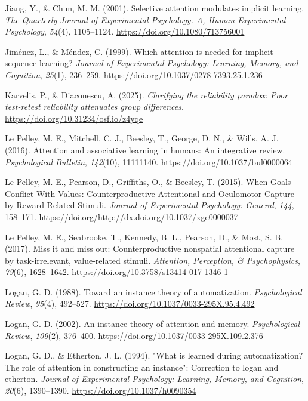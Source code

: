 \documentclass[
  jou,
  floatsintext,
  longtable,
  nolmodern,
  notxfonts,
  notimes,
  colorlinks=true,linkcolor=blue,citecolor=blue,urlcolor=blue]{apa7}
\newlength{\cslhangindent}
\newenvironment{CSLReferences}[2] %
 {\begin{list}{}{%
  \setlength{\itemindent}{0pt}
  \setlength{\leftmargin}{0pt}
  \setlength{\parsep}{0pt}
  \ifodd #1
   \setlength{\leftmargin}{\cslhangindent}
   \setlength{\itemindent}{-1\cslhangindent}
  \fi
  \setlength{\itemsep}{#2\baselineskip}}}
 {\end{list}}
\begin{document}
\begin{CSLReferences}{1}{0}
Jiang, Y., \& Chun, M. M. (2001). Selective attention modulates implicit
learning. \emph{The Quarterly Journal of Experimental Psychology. A,
Human Experimental Psychology}, \emph{54}(4), 1105--1124.
\url{https://doi.org/10.1080/713756001}

Jiménez, L., \& Méndez, C. (1999). Which attention is needed for
implicit sequence learning? \emph{Journal of Experimental Psychology:
Learning, Memory, and Cognition}, \emph{25}(1), 236--259.
\url{https://doi.org/10.1037/0278-7393.25.1.236}

Karvelis, P., \& Diaconescu, A. (2025). \emph{Clarifying the reliability
paradox: Poor test-retest reliability attenuates group differences}.
\url{https://doi.org/10.31234/osf.io/z4yqe}

Le Pelley, M. E., Mitchell, C. J., Beesley, T., George, D. N., \& Wills,
A. J. (2016). Attention and associative learning in humans: An
integrative review. \emph{Psychological Bulletin}, \emph{142}(10),
11111140. \url{https://doi.org/10.1037/bul0000064}

Le Pelley, M. E., Pearson, D., Griffiths, O., \& Beesley, T. (2015).
When Goals Conflict With Values: Counterproductive Attentional and
Oculomotor Capture by Reward-Related Stimuli. \emph{Journal of
Experimental Psychology: General}, \emph{144}, 158--171.
https://doi.org/\url{http://dx.doi.org/10.1037/xge0000037}

Le Pelley, M. E., Seabrooke, T., Kennedy, B. L., Pearson, D., \& Most,
S. B. (2017). Miss it and miss out: Counterproductive nonspatial
attentional capture by task-irrelevant, value-related stimuli.
\emph{Attention, Perception, \& Psychophysics}, \emph{79}(6),
1628--1642. \url{https://doi.org/10.3758/s13414-017-1346-1}

Logan, G. D. (1988). Toward an instance theory of automatization.
\emph{Psychological Review}, \emph{95}(4), 492--527.
\url{https://doi.org/10.1037/0033-295X.95.4.492}

Logan, G. D. (2002). An instance theory of attention and memory.
\emph{Psychological Review}, \emph{109}(2), 376--400.
\url{https://doi.org/10.1037/0033-295X.109.2.376}

Logan, G. D., \& Etherton, J. L. (1994). {"}What is learned during
automatization? The role of attention in constructing an instance{"}:
Correction to logan and etherton. \emph{Journal of Experimental
Psychology: Learning, Memory, and Cognition}, \emph{20}(6), 1390--1390.
\url{https://doi.org/10.1037/h0090354}


\end{CSLReferences}
\end{document}
